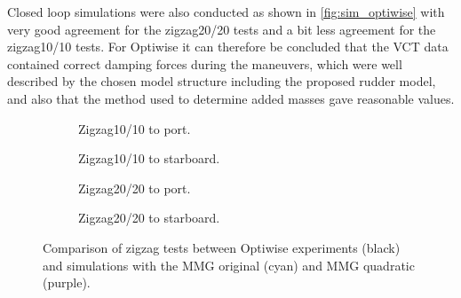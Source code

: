Closed loop simulations were also conducted as shown in \autoref{fig:sim_optiwise} with very good agreement for the zigzag20/20 tests and a bit less agreement for the zigzag10/10 tests.
For Optiwise it can therefore be concluded that
the VCT data contained correct damping forces during the maneuvers, which were well
described by the chosen model structure including the proposed rudder model, and also that the method used to determine added masses gave reasonable values.
\begin{figure}[h]
     \centering
     \begin{subfigure}[b]{0.49\textwidth}
         \centering
         
        \caption{Zigzag10/10 to port.}
        \label{fig:sim_optiwise_10_port}
     \end{subfigure}
     \hfill
     \begin{subfigure}[b]{0.49\textwidth}
         
        \caption{Zigzag10/10 to starboard.}
        \label{fig:sim_optiwise_10_stbd}
     \end{subfigure}
     \vfill
     \begin{subfigure}[b]{0.49\textwidth}
         \centering
         
        \caption{Zigzag20/20 to port.}
        \label{fig:sim_optiwise_20_port}
     \end{subfigure}
     \hfill
     \begin{subfigure}[b]{0.49\textwidth}
         
        \caption{Zigzag20/20 to starboard.}
        \label{fig:sim_optiwise_20_stbd}
     \end{subfigure}
     
        \caption{Comparison of zigzag tests between Optiwise experiments (black) and simulations with the MMG original (cyan) and MMG quadratic (purple).}
        \label{fig:sim_optiwise}
\end{figure}
\clearpage